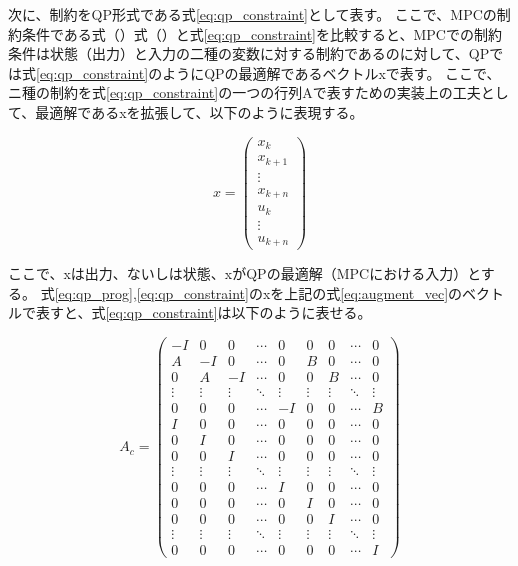 次に、制約をQP形式である式\eqref{eq:qp_constraint}として表す。
ここで、MPCの制約条件である式（）式（）と式\eqref{eq:qp_constraint}を比較すると、MPCでの制約条件は状態（出力）と入力の二種の変数に対する制約であるのに対して、QPでは式\eqref{eq:qp_constraint}のようにQPの最適解であるベクトルxで表す。
ここで、ニ種の制約を式\eqref{eq:qp_constraint}の一つの行列Aで表すための実装上の工夫として、最適解であるxを拡張して、以下のように表現する。

\begin{equation}
  x =
  \begin{pmatrix}
    x_{k} \\ x_{k+1} \\ \vdots \\ x_{k+n}
    \\
    u_{k} \\ \vdots \\ u_{k+n}
  \end{pmatrix}
  \label{eq:augment_vec}
\end{equation}

ここで、xは出力、ないしは状態、xがQPの最適解（MPCにおける入力）とする。
式\eqref{eq:qp_prog},\eqref{eq:qp_constraint}のxを上記の式\eqref{eq:augment_vec}のベクトルで表すと、式\eqref{eq:qp_constraint}は以下のように表せる。

\begin{equation}
  A_{c} =
  \left(
  \begin{array}{ccccc|cccc}
      -I & 0 & 0 & \cdots & 0 & 0 & 0 & \cdots & 0 \\ A & -I & 0 & \cdots & 0 & B & 0 & \cdots & 0 \\ 0 & A & -I & \cdots & 0 & 0 & B & \cdots & 0\\ \vdots & \vdots & \vdots & \ddots & \vdots & \vdots & \vdots & \ddots & \vdots \\ 0 & 0 & 0 & \cdots & -I & 0 & 0 & \cdots & B\\ \hline I & 0 & 0 & \cdots & 0 & 0 & 0 & \cdots & 0\\ 0 & I & 0 & \cdots & 0 & 0 & 0 & \cdots & 0\\ 0 & 0 & I & \cdots & 0 & 0 & 0 & \cdots & 0\\ \vdots & \vdots & \vdots & \ddots & \vdots & \vdots & \vdots & \ddots & \vdots \\ 0 & 0 & 0 & \cdots & I & 0 & 0 & \cdots & 0\\ 0 & 0 & 0 & \cdots & 0 & I & 0 & \cdots & 0\\ 0 & 0 & 0 & \cdots & 0 & 0 & I & \cdots & 0\\ \vdots & \vdots & \vdots & \ddots & \vdots & \vdots & \vdots & \ddots & \vdots \\ 0 & 0 & 0 & \cdots & 0 & 0 & 0 & \cdots & I
    \end{array}
  \right)
  \label{eq:mpc_constraint_matrix}
\end{equation}

